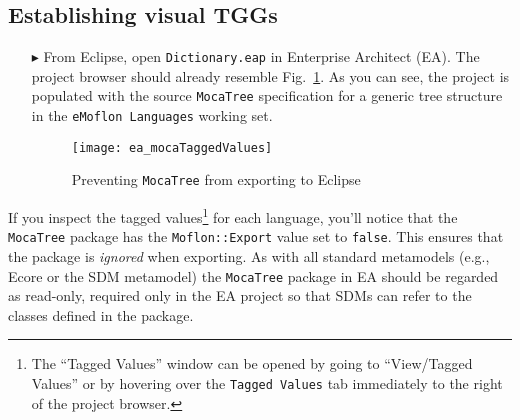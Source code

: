 \newpage
\hypertarget{initialize vis}{}
\subsection{Establishing visual TGGs}
\visHeader

\begin{itemize}

\item[$\blacktriangleright$] From Eclipse, open \texttt{Dict\-ion\-ary.eap} in Enterprise Architect (EA). The project browser should already resemble
Fig.~\ref{ea:mocaTagged}. As you can see, the project is populated with the source \texttt{MocaTree} specification for a generic tree structure in the
\texttt{eMoflon Languages} working set.

\vspace{0.5cm}

\begin{figure}[htpb]
\begin{center}
  \texttt{[image: ea\_mocaTaggedValues]}
  \caption{Preventing \texttt{MocaTree} from exporting to Eclipse}
  \label{ea:mocaTagged}
\end{center}
\end{figure}

\end{itemize}
\vspace{-0.5cm}
If you inspect the tagged values\footnote{The ``Tagged Values'' window can be opened by going to ``View/Tagged Values'' or by hovering over the \texttt{Tagged
Values} tab immediately to the right of the project browser.} for each language, you'll notice that the \texttt{MocaTree} package has the
\texttt{Moflon::Export} value set to \texttt{false}. This ensures that the package is \emph{ignored} when exporting. As with all standard metamodels (e.g.,
Ecore or the SDM metamodel) the \texttt{MocaTree} package in EA should be regarded as read-only, required only in the EA project so that SDMs can refer to the
classes defined in the package.

